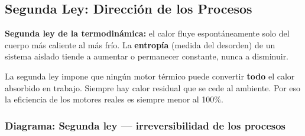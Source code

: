 \subsection{Segunda Ley: Dirección de los Procesos}

\begin{seccion}
\begin{definicion}
\textbf{Segunda ley de la termodinámica:} el calor fluye espontáneamente solo del cuerpo más caliente al más frío. La \textbf{entropía} (medida del desorden) de un sistema aislado tiende a aumentar o permanecer constante, nunca a disminuir.
\end{definicion}

\begin{nota}
La segunda ley impone que ningún motor térmico puede convertir \textbf{todo} el calor absorbido en trabajo. Siempre hay calor residual que se cede al ambiente. Por eso la eficiencia de los motores reales es siempre menor al 100\%.
\end{nota}
\end{seccion}

\subsubsection{Diagrama: Segunda ley --- irreversibilidad de los procesos}

